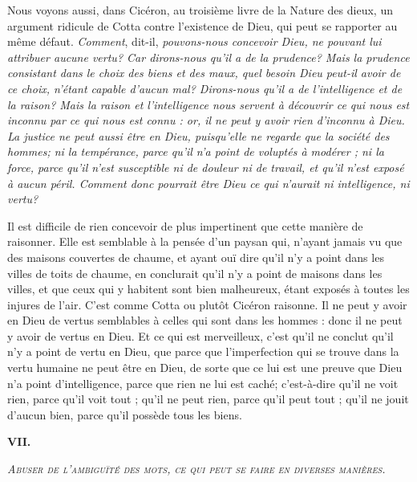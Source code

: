 Nous voyons aussi, dans Cicéron, au troisième livre de la Nature des dieux, un argument ridicule de Cotta contre l'existence de Dieu, qui peut se rapporter au même défaut. \emph{Comment}, dit-il, \emph{pouvons-nous concevoir Dieu, ne pouvant lui attribuer aucune vertu? Car dirons-nous qu'il a de la prudence? Mais la prudence consistant dans le choix des biens et des maux, quel besoin Dieu peut-il avoir de ce choix, n'étant capable d'aucun mal? Dirons-nous qu'il a de l'intelligence et de la raison? Mais la raison et l'intelligence nous servent à découvrir ce qui nous est inconnu par ce qui nous est connu : or, il ne peut y avoir rien d'inconnu à Dieu. La justice ne peut aussi être en Dieu, puisqu'elle ne regarde que la société des hommes; ni la tempérance, parce qu'il n'a point de voluptés à modérer ; ni la force, parce qu'il n'est susceptible ni de douleur ni de travail, et qu'il n'est exposé à aucun péril. Comment donc pourrait être Dieu ce qui n'aurait ni intelligence, ni vertu?}

Il est difficile de rien concevoir de plus impertinent que cette manière de raisonner. Elle est semblable à la pensée d'un paysan qui, n'ayant jamais vu que des maisons couvertes de chaume, et ayant ouï dire qu'il n'y a point dans les villes de toits de chaume, en conclurait qu'il n'y a point de maisons dans les villes, et que ceux qui y habitent sont bien malheureux, étant exposés à toutes les injures de l'air. C'est comme Cotta ou plutôt Cicéron raisonne. Il ne peut y avoir en Dieu de vertus semblables à celles qui sont dans les hommes : donc il ne peut y avoir de vertus en Dieu. Et ce qui est merveilleux, c'est qu'il ne conclut qu'il n'y a point de vertu en Dieu, que parce que l'imperfection qui se trouve dans la vertu humaine ne peut être en Dieu, de sorte que ce lui est une preuve que Dieu n'a point d'intelligence, parce que rien ne lui est caché; c'est-à-dire qu'il ne voit rien, parce qu'il voit tout ; qu'il ne peut rien, parce qu'il peut tout ; qu'il ne jouit d'aucun bien, parce qu'il possède tous les biens.

\begin{center}{\bfseries\large VII.}\end{center}
\begin{center}\emph{\scshape Abuser de l'ambiguïté des mots, ce qui peut se faire en diverses manières.}\end{center}

